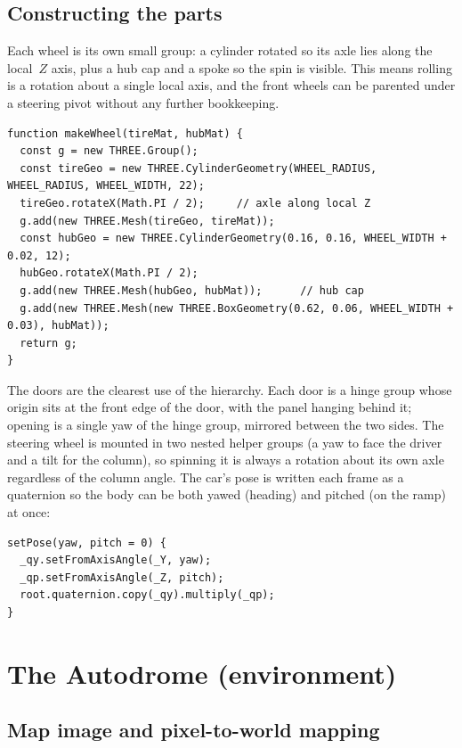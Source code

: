 \documentclass[11pt]{article}
\newcommand{\code}[1]{\texttt{#1}}
\begin{document}
\subsection{Constructing the parts}

Each wheel is its own small group: a cylinder rotated so its axle lies along
the local~$Z$ axis, plus a hub cap and a spoke so the spin is visible. This
means rolling is a rotation about a single local axis, and the front wheels can
be parented under a steering pivot without any further bookkeeping.

\begin{lstlisting}[caption={Wheel construction (\code{car.js}).}]
function makeWheel(tireMat, hubMat) {
  const g = new THREE.Group();
  const tireGeo = new THREE.CylinderGeometry(WHEEL_RADIUS, WHEEL_RADIUS, WHEEL_WIDTH, 22);
  tireGeo.rotateX(Math.PI / 2);     // axle along local Z
  g.add(new THREE.Mesh(tireGeo, tireMat));
  const hubGeo = new THREE.CylinderGeometry(0.16, 0.16, WHEEL_WIDTH + 0.02, 12);
  hubGeo.rotateX(Math.PI / 2);
  g.add(new THREE.Mesh(hubGeo, hubMat));      // hub cap
  g.add(new THREE.Mesh(new THREE.BoxGeometry(0.62, 0.06, WHEEL_WIDTH + 0.03), hubMat));
  return g;
}
\end{lstlisting}

The doors are the clearest use of the hierarchy. Each door is a hinge group
whose origin sits at the front edge of the door, with the panel hanging behind
it; opening is a single yaw of the hinge group, mirrored between the two sides.
The steering wheel is mounted in two nested helper groups (a yaw to face the
driver and a tilt for the column), so spinning it is always a rotation about its
own axle regardless of the column angle. The car's pose is written each frame as
a quaternion so the body can be both yawed (heading) and pitched (on the ramp)
at once:

\begin{lstlisting}[caption={Combined yaw and pitch as a quaternion (\code{car.js}).}]
setPose(yaw, pitch = 0) {
  _qy.setFromAxisAngle(_Y, yaw);
  _qp.setFromAxisAngle(_Z, pitch);
  root.quaternion.copy(_qy).multiply(_qp);
}
\end{lstlisting}

\section{The Autodrome (environment)}

\subsection{Map image and pixel-to-world mapping}
\end{document}
